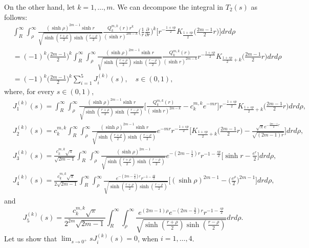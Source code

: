 \documentclass[a4paper,10pt, reqno]{amsart}
\theoremstyle{definition}
\theoremstyle{remark}
\numberwithin{equation}{section}
\begin{document}
{On the other hand, let $k=1,\ldots, m$. We can decompose the integral in $T_2(s)$ as follows:
\begin{align}\label{Jik}
    &\int_R^\infty \int_\rho ^\infty \frac{(\sinh \rho )^{2m-1}\sinh r}{\sqrt{\sinh (\frac{r+\rho}{2})\sinh (\frac{r-\rho }{2})}}\frac{Q_k^{m,k}(r)r^k}{(\sinh r)^{2m-k}}\Big(\frac{1}{r}\frac{\partial }{\partial r}\Big)^k\big[r ^{-\frac{1+sp}{2}}K_{\frac{1+sp}{2}}\big(\tfrac{2m-1}{2}r\big)\big]drd\rho\nonumber\\
    &=(-1)^k\big(\tfrac{2m-1}{2}\big)^k\int_R^\infty \int_\rho ^\infty \frac{(\sinh \rho )^{2m-1}\sinh r}{\sqrt{\sinh (\frac{r+\rho}{2})\sinh (\frac{r-\rho }{2})}}\frac{Q_k^{m,k}(r)}{(\sinh r)^{2m-k}}r^{-\frac{1+sp}{2}}K_{\frac{1+sp}{2}+k}\big(\tfrac{2m-1}{2}r\big)drd\rho\nonumber\\
    &=(-1)^k\big(\tfrac{2m-1}{2}\big)^k\sum_{i=1}^5J_i^{(k)}(s),\quad s\in (0,1),
\end{align}
where, for every $s\in (0,1)$,
\begin{align*}
&J_1^{(k)}(s)=\int_R^\infty \!\!\!\int_\rho ^\infty \frac{(\sinh \rho )^{2m-1}\sinh r}{\sqrt{\sinh (\frac{r+\rho}{2})\sinh (\frac{r-\rho }{2})}}\Big[\frac{Q_k^{m,k}(r)}{(\sinh r)^{2m-k}}-c_k^{m,k}e^{-mr}\Big]r ^{-\frac{1+sp}{2}}K_{\frac{1+sp}{2}+k}\big(\tfrac{2m-1}{2}r\big)drd\rho,\\
&J_2^{(k)}(s)=c_k^{m,k}\int_R^\infty \!\!\!\int_\rho ^\infty\frac{(\sinh \rho )^{2m-1}\sinh r}{\sqrt{\sinh (\frac{r+\rho}{2})\sinh (\frac{r-\rho }{2})}}e^{-mr}r^{-\frac{1+sp}{2}}\Big[K_{\frac{1+sp}{2}+k}\big(\tfrac{2m-1}{2}r\big)-\frac{\sqrt{\pi}e^{-\frac{2m-1}{2}r}}{\sqrt{(2m-1)r}}\Big]drd\rho,\\
&J_3^{(k)}(s)=\frac{c_k^{m,k}\sqrt{\pi}}{\sqrt{2m-1}} \int_R^\infty \!\!\!\int_\rho ^\infty\frac{(\sinh \rho )^{2m-1}}{\sqrt{\sinh (\frac{r+\rho}{2})\sinh (\frac{r-\rho }{2})}}e^{-(2m-\frac{1}{2})r}r^{-1-\frac{sp}{2}}\big[\sinh r-\frac{e^r}{2}\big]drd\rho,\\
&J_4^{(k)}(s)=\frac{c_k^{m,k}\sqrt{\pi}}{2\sqrt{2m-1}}\int_R^\infty \!\!\!\int_\rho ^\infty\frac{e^{-(2m-\frac{3}{2})r}r^{-1-\frac{sp}{2}}}{\sqrt{\sinh (\frac{r+\rho}{2})\sinh (\frac{r-\rho }{2})}}\Big[(\sinh \rho )^{2m-1}-\Big(\frac{e^\rho}{2}\Big)^{2m-1}\Big]drd\rho,
\end{align*}
and
$$
J_5^{(k)}(s)=\frac{c_k^{m,k}\sqrt{\pi}}{2^{2m}\sqrt{2m-1}}\int_R^\infty \!\!\!\int_\rho ^\infty\frac{e^{(2m-1)\rho }e^{-(2m-\frac{3}{2})r}r^{-1-\frac{sp}{2}}}{\sqrt{\sinh (\frac{r+\rho}{2})\sinh (\frac{r-\rho }{2})}}drd\rho.
$$
Let us show that $\lim_{s\rightarrow 0^+}sJ_i^{(k)}(s)=0$, when $i=1,\ldots, 4$. 

}
\end{document}
